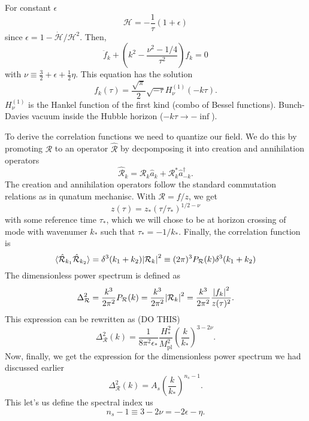 \documentclass[12pt]{article}
\begin{document}
For constant $\epsilon$
\begin{equation}
    \mathcal{H} = -\frac{1}{\tau}(1+\epsilon)
\end{equation}
since $\epsilon = 1-\dot{\mathcal{H}}/\mathcal{H}^2$. Then,
\begin{equation}
    \ddot{f}_k + \left(k^2 - \frac{\nu^2 - 1/4}{\tau^2}\right)f_k = 0
\end{equation}
with $\nu \equiv \frac{3}{2} + \epsilon + \frac{1}{2} \eta$. This equation has the solution
\begin{equation}
    f_k(\tau) = \frac{\sqrt{\pi}}{2}\sqrt{-\tau}H_\nu^{(1)}(-k\tau).
\end{equation}  
$H^{(1)}_\nu$ is the Hankel function of the first kind (combo of Bessel functions). Bunch-Davies vacuum inside the Hubble horizon ($-k\tau \rightarrow - \inf$).

To derive the correlation functions we need to quantize our field. We do this by promoting $\mathcal{R}$ to an operator $\hat{\mathcal{R}}$ by decpomposing it into creation and annihilation operators
\begin{equation}
    \hat{\mathcal{R}}_k = \mathcal{R}_k \hat{a}_k + \mathcal{R}_k^* \hat{a}^\dagger_{-k}.
\end{equation}
The creation and annihilation operators follow the standard commutation relations as in qunatum mechanisc. With $\mathcal{R} = f/z$, we get
\begin{equation}
    z(\tau)= z_*(\tau/\tau_*)^{1/2 - \nu}
\end{equation}
with some reference time $\tau_*$, which we will chose to be at horizon crossing of mode with wavenumer $k_*$ such that $\tau_* = -1/k_*$. Finally, the correlation function is 
\begin{equation}
    \langle \hat{\mathcal{R}}_{k_1}\hat{\mathcal{R}}_{k_2} \rangle = \delta^3(k_1 +k_2) \abs{\mathcal{R}_k}^2 \equiv (2\pi)^3 P_\mathcal{R}(k) \delta^3(k_1+k_2)
\end{equation}
The dimensionless power spectrum is defined as 
\begin{equation}
    \Delta_\mathcal{R}^2 = \frac{k^3}{2\pi^2}P_\mathcal{R}(k) = \frac{k^3}{2\pi^2}\abs{\mathcal{R}_k}^2 = \frac{k^3}{2\pi^2} \frac{\abs{f_k}^2}{z(\tau)^2}.
\end{equation}
This expression can be rewritten as (DO THIS)
\begin{equation}
    \Delta_\mathcal{R}^2(k) = \frac{1}{8\pi^2\epsilon_*}\frac{H_*^2}{M_\mathrm{pl}^2}\left(\frac{k}{k_*} \right)^{3-2\nu}.
\end{equation}
Now, finally, we get the expression for the dimensionless power spectrum we had discussed earlier 
\begin{equation}
    \Delta_\mathcal{R}^2(k) = A_s\left(\frac{k}{k_*} \right)^{n_s-1}.
\end{equation}
This let's us define the spectral index us
\begin{equation}
    n_s - 1 \equiv 3-2\nu = -2\epsilon - \eta.
\end{equation}
\end{document}
